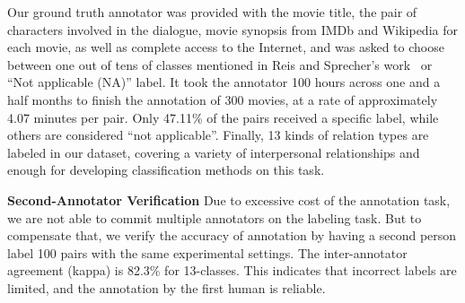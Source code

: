 Our ground truth annotator was provided with the movie title, the pair of characters involved in the dialogue, movie synopsis from IMDb and Wikipedia for each movie, as well as complete access to the Internet, and was asked to choose between one out of tens of classes mentioned in Reis and Sprecher's work~\cite{reis2009encyclopedia} or “Not applicable (NA)” label.
It took the annotator 100 hours across one and a half months to finish the annotation of 300 movies, at a rate of approximately 4.07 minutes per pair. Only 47.11\% of the pairs received a specific label, while others are considered “not applicable”. Finally, 13 kinds of relation types are labeled in our dataset, covering a variety of interpersonal relationships and enough for developing classification methods on this task.

\textbf{Second-Annotator Verification}
Due to excessive cost of the annotation task, we are not able to commit multiple annotators on the labeling task. But to compensate that, we verify the accuracy of annotation by having a second person label 100 pairs with the same experimental settings. The inter-annotator agreement (kappa) is 82.3\% for 13-classes. This indicates that incorrect labels are limited, and the annotation by the first human is reliable.




